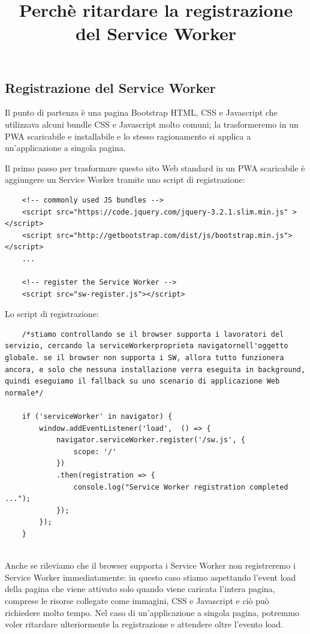 \documentclass[italian]{article}
\begin{document}
\subsection{Registrazione del Service Worker}
Il punto di partenza è una pagina Bootstrap HTML, CSS e Javascript che utilizzava alcuni bundle CSS e Javascript molto comuni; la trasformeremo in un PWA scaricabile e installabile e lo stesso ragionamento si applica a un'applicazione a singola pagina.

Il primo passo per trasformare questo sito Web standard in un PWA scaricabile è aggiungere un Service Worker tramite uno script di registrazione:
\begin{lstlisting}
	<!-- commonly used JS bundles -->
	<script src="https://code.jquery.com/jquery-3.2.1.slim.min.js" ></script>
	<script src="http://getbootstrap.com/dist/js/bootstrap.min.js"></script>
	...
	
	<!-- register the Service Worker -->
	<script src="sw-register.js"></script>
\end{lstlisting}
Lo script di registrazione:
\begin{lstlisting}
	/*stiamo controllando se il browser supporta i lavoratori del servizio, cercando la serviceWorkerproprieta navigatornell'oggetto globale. se il browser non supporta i SW, allora tutto funzionera ancora, e solo che nessuna installazione verra eseguita in background, quindi eseguiamo il fallback su uno scenario di applicazione Web normale*/

	if ('serviceWorker' in navigator) {
		window.addEventListener('load',  () => {
			navigator.serviceWorker.register('/sw.js', {
				scope: '/'
			})
			.then(registration => {
				console.log("Service Worker registration completed ...");
			});
		});
	}
\end{lstlisting}

\title{\textbf{Perchè ritardare la registrazione del Service Worker}}\\
Anche se rileviamo che il browser supporta i Service Worker non registreremo i Service Worker immediatamente: in questo caso stiamo aspettando l'event load della pagina che viene attivato solo quando viene caricata l'intera pagina, comprese le risorse collegate come immagini, CSS e Javascript e ciò può richiedere molto tempo. Nel caso di un'applicazione a singola pagina, potremmo voler ritardare ulteriormente la registrazione e attendere oltre l'evento load.
\end{document}
